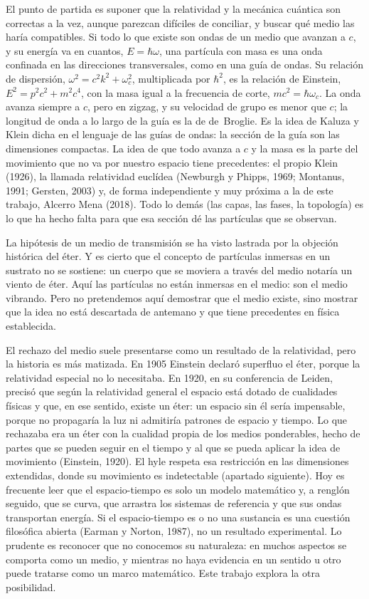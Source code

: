 \documentclass[11pt,a4paper]{article}
\begin{document}
El punto de partida es suponer que la relatividad y la mecánica cuántica son correctas a la vez, aunque parezcan difíciles de conciliar, y buscar qué medio las haría compatibles. Si todo lo que existe son ondas de un medio que avanzan a $c$, y su energía va en cuantos, $E=\hbar\omega$, una partícula con masa es una onda confinada en las direcciones transversales, como en una guía de ondas. Su relación de dispersión, $\omega^2=c^2k^2+\omega_c^2$, multiplicada por $\hbar^2$, es la relación de Einstein, $E^2=p^2c^2+m^2c^4$, con la masa igual a la frecuencia de corte, $mc^2=\hbar\omega_c$. La onda avanza siempre a $c$, pero en zigzag, y su velocidad de grupo es menor que $c$; la longitud de onda a lo largo de la guía es la de de~Broglie. Es la idea de Kaluza y Klein dicha en el lenguaje de las guías de ondas: la sección de la guía son las dimensiones compactas. La idea de que todo avanza a $c$ y la masa es la parte del movimiento que no va por nuestro espacio tiene precedentes: el propio Klein (1926), la llamada relatividad euclídea (Newburgh y Phipps, 1969; Montanus, 1991; Gersten, 2003) y, de forma independiente y muy próxima a la de este trabajo, Alcerro Mena (2018). Todo lo demás (las capas, las fases, la topología) es lo que ha hecho falta para que esa sección dé las partículas que se observan.

La hipótesis de un medio de transmisión se ha visto lastrada por la objeción histórica del éter. Y es cierto que el concepto de partículas inmersas en un sustrato no se sostiene: un cuerpo que se moviera a través del medio notaría un viento de éter. Aquí las partículas no están inmersas en el medio: son el medio vibrando. Pero no pretendemos aquí demostrar que el medio existe, sino mostrar que la idea no está descartada de antemano y que tiene precedentes en física establecida.

El rechazo del medio suele presentarse como un resultado de la relatividad, pero la historia es más matizada. En 1905 Einstein declaró superfluo el éter, porque la relatividad especial no lo necesitaba. En 1920, en su conferencia de Leiden, precisó que según la relatividad general el espacio está dotado de cualidades físicas y que, en ese sentido, existe un éter: un espacio sin él sería impensable, porque no propagaría la luz ni admitiría patrones de espacio y tiempo. Lo que rechazaba era un éter con la cualidad propia de los medios ponderables, hecho de partes que se pueden seguir en el tiempo y al que se pueda aplicar la idea de movimiento (Einstein, 1920). El hyle respeta esa restricción en las dimensiones extendidas, donde su movimiento es indetectable (apartado siguiente). Hoy es frecuente leer que el espacio-tiempo es solo un modelo matemático y, a renglón seguido, que se curva, que arrastra los sistemas de referencia y que sus ondas transportan energía. Si el espacio-tiempo es o no una sustancia es una cuestión filosófica abierta (Earman y Norton, 1987), no un resultado experimental. Lo prudente es reconocer que no conocemos su naturaleza: en muchos aspectos se comporta como un medio, y mientras no haya evidencia en un sentido u otro puede tratarse como un marco matemático. Este trabajo explora la otra posibilidad.
\end{document}
